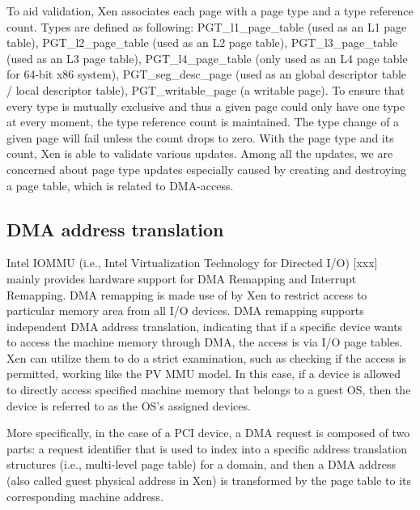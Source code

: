 
To aid validation, Xen associates each page with a page type and a type reference count. Types are defined as following: PGT\_l1\_page\_table (used as an L1 page table), PGT\_l2\_page\_table (used as an L2 page table), PGT\_l3\_page\_table (used as an L3 page table), PGT\_l4\_page\_table (only used as an L4 page table for 64-bit x86 system), PGT\_seg\_desc\_page (used as an global descriptor table / local descriptor table), PGT\_writable\_page (a writable page). To ensure that every type is mutually exclusive and thus a given page could only have one type at every moment, the type reference count is maintained. The type change of a given page will fail unless the count drops to zero. With the page type and its count, Xen is able to validate various updates. Among all the updates, we are concerned about page type updates especially caused by creating and destroying a page table, which is related to DMA-access.

\subsection{DMA address translation}

Intel IOMMU (i.e., Intel Virtualization Technology for Directed I/O) [xxx] mainly provides hardware support for DMA Remapping and Interrupt Remapping. DMA remapping is made use of by Xen to restrict access to particular memory area from all I/O devices. DMA remapping supports independent DMA address translation, indicating that if a specific device wants to access the machine memory through DMA, the access is via I/O page tables. Xen can utilize them to do a strict examination, such as checking if the access is permitted, working like the PV MMU model. In this case, if a device is allowed to directly access specified machine memory that belongs to a guest OS, then the device is referred to as the OS's assigned devices.

More specifically, in the case of a PCI device, a DMA request is composed of two parts: a request identifier that is used to index into a specific address translation structures (i.e., multi-level page table) for a domain, and then a DMA address (also called guest physical address in Xen) is transformed by the page table to its corresponding machine address.

